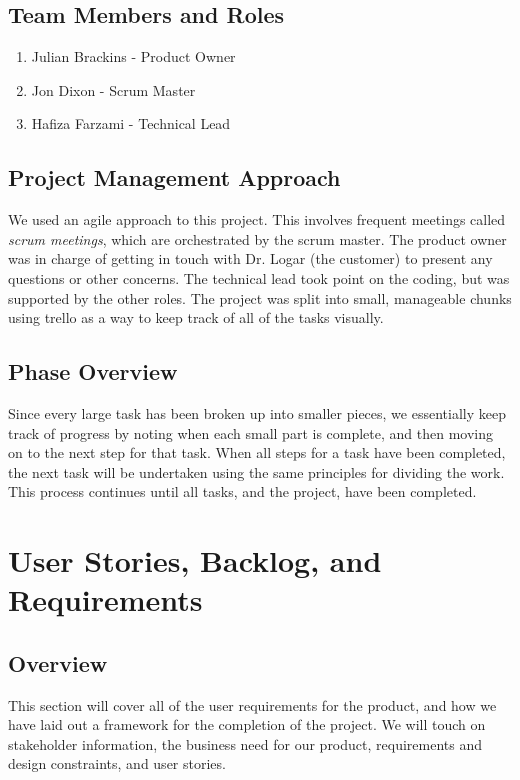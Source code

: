 \documentclass {article}
\begin{document}
		 	\subsection{\Large{\color{blue}Team Members and Roles}}
		 	 	\begin{enumerate}
		 	 		\item Julian Brackins - Product Owner
		 	 		\item Jon Dixon - Scrum Master
		 	 		\item Hafiza Farzami - Technical Lead
		 	 	\end{enumerate}
		 	 	
		 	\subsection{\Large{\color{blue}Project Management Approach}}
		 		We used an agile approach to this project. This involves frequent
		 	 	 meetings called \textit{scrum meetings}, which are orchestrated
		 	 	 by the scrum master. The product owner was in charge of getting
		 	 	 in touch with Dr. Logar (the customer) to present any questions
		 	 	 or other concerns. The technical lead took point on the coding,
		 	 	 but was supported by the other roles. The project was split into
		 	 	 small, manageable chunks using trello as a way to keep track of
		 	 	 all of the tasks visually.
		 	 	 
			\subsection{\Large{\color{blue}Phase Overview}}
				Since every large task has been broken up into smaller pieces, we
				 essentially keep track of progress by noting when each small part
				 is complete, and then moving on to the next step for that task.
				 When all steps for a task have been completed, the next task will
				 be undertaken using the same principles for dividing the work.
				 This process continues until all tasks, and the project, have
				 been completed.
		 	 
		 \newpage
		 
	\section{\LARGE{\color{blue}User Stories, Backlog, and Requirements}}
		\subsection{\Large{\color{blue}Overview}}
	 		This section will cover all of the user requirements for the product,
	 		 and how we have laid out a framework for the completion of the
	 		 project. We will touch on stakeholder information, the business need
	 		 for our product, requirements and design constraints, and user
	 		 stories.
	 		 
\end{document}
